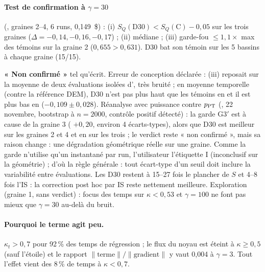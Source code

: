 \paragraph{Test de confirmation à $\gamma=30$} (, graines 2--4, 6 runs, 0,149~\$) : (i) $S_Q(\text{D30})<S_Q(\text{C})-0{,}05$ \vrai{} sur les trois graines ($\Delta=-0{,}14,-0{,}16,-0{,}17$) ; (ii) médiane \vrai{} ; (iii) garde-fou $\le1{,}1\times$ max des témoins \faux{} sur la graine 2 ($0{,}655>0{,}631$). D30 bat son témoin sur les 5 bassins à chaque graine (15/15).
\begin{verdict}\textbf{« Non confirmé »} tel qu'écrit. Erreur de conception déclarée : (iii) reposait sur la moyenne de deux évaluations isolées d', très bruité ; en moyenne temporelle (contre la référence DEM), D30 n'est pas plus haut que les témoins en  et il est plus bas en  ($-0{,}109\pm0{,}028$). Réanalyse avec puissance contre $p_{\rm PT}$ (, 22 novembre, bootstrap à $n=2000$, contrôle positif détecté) : la garde G3$'$ est \faux{} à cause de la graine 3 ( $+0{,}20$, environ 4 écarts-types), alors que D30 est meilleur sur les graines 2 et 4 et en  sur les trois ; le verdict reste « non confirmé », mais sa raison change : une dégradation géométrique réelle sur une graine. Comme la garde n'utilise qu'un instantané par run, l'utilisateur l'étiquette I (inconclusif sur la géométrie) ; d'où la règle générale : tout écart-type d'un seuil doit inclure la variabilité entre évaluations. Les D30 restent à 15--27 fois le plancher de $S$ et 4--8 fois l'IS : la correction post hoc par IS reste nettement meilleure. Exploration (graine 1, sans verdict) : focus des temps sur $\kappa<0{,}53$ et $\gamma=100$ ne font pas mieux que $\gamma=30$ au-delà du bruit.\end{verdict}

\paragraph{Pourquoi le terme agit peu.} $\kappa_t>0{,}7$ pour 92\,\% des temps de régression ; le flux du noyau est éteint à $\kappa\ge0{,}5$ (sauf l'étoile) et le rapport $\|\text{terme}\|/\|\text{gradient}\|$ y vaut 0,004 à $\gamma=3$. Tout l'effet vient des 8\,\% de temps à $\kappa<0{,}7$.
